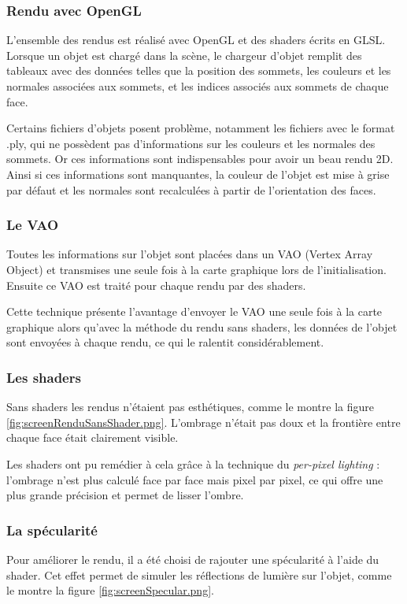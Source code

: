 \subsubsection{Rendu avec OpenGL}
L'ensemble des rendus est réalisé avec OpenGL et des shaders écrits en GLSL. Lorsque un objet est chargé dans la scène, le chargeur d'objet remplit des tableaux avec des données telles que la position des sommets, les couleurs et les normales associées aux sommets, et les indices associés aux sommets de chaque face.

Certains fichiers d'objets posent problème, notamment les fichiers avec le format .ply, qui ne possèdent pas d'informations sur les couleurs et les normales des sommets. Or ces informations sont indispensables pour avoir un beau rendu 2D. Ainsi si ces informations sont manquantes, la couleur de l'objet est mise à grise par défaut et les normales sont recalculées à partir de l'orientation des faces.


\subsubsection{Le VAO}
Toutes les informations sur l'objet sont placées dans un VAO (Vertex Array Object) et transmises une seule fois à la carte graphique lors de l'initialisation. Ensuite ce VAO est traité pour chaque rendu par des shaders.

Cette technique présente l'avantage d'envoyer le VAO une seule fois à la carte graphique alors qu'avec la méthode du rendu sans shaders, les données de l'objet sont envoyées à chaque rendu, ce qui le ralentit considérablement.

\subsubsection{Les shaders}
Sans shaders les rendus n'étaient pas esthétiques, comme le montre la figure \ref{fig:screenRenduSansShader.png}. L'ombrage n'était pas doux et la frontière entre chaque face était clairement visible. 

Les shaders ont pu remédier à cela grâce à la technique du \textit{per-pixel lighting} : l'ombrage n'est plus calculé face par face mais pixel par pixel, ce qui offre une plus grande précision et permet de lisser l'ombre.

\subsubsection{La spécularité}
Pour améliorer le rendu, il a été choisi de rajouter une spécularité à l'aide du shader. Cet effet permet de simuler les réflections de lumière sur l'objet, comme le montre la figure \ref{fig:screenSpecular.png}.

